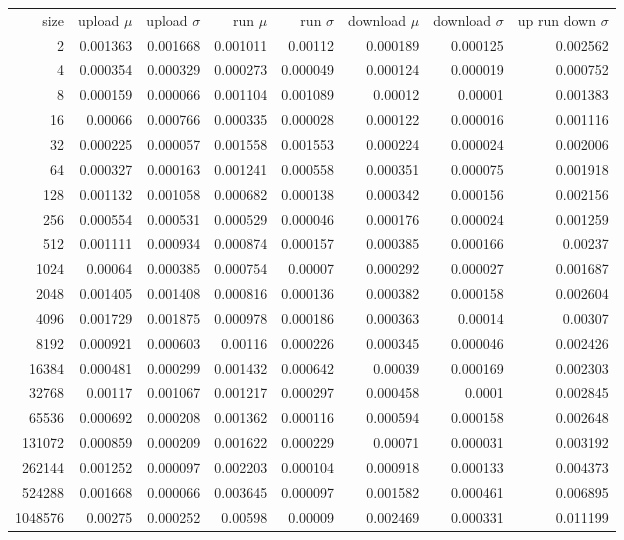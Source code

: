 \begin{tabular}{r r r r r r r r}
size & upload $\mu$  & upload $\sigma$ & run $\mu$ & run $\sigma$ & download $\mu$ & download $\sigma$ & up run down $\sigma$ \\
2 & 0.001363 & 0.001668 & 0.001011 & 0.00112 & 0.000189 & 0.000125 & 0.002562 \\
4 & 0.000354 & 0.000329 & 0.000273 & 0.000049 & 0.000124 & 0.000019 & 0.000752 \\
8 & 0.000159 & 0.000066 & 0.001104 & 0.001089 & 0.00012 & 0.00001 & 0.001383 \\
16 & 0.00066 & 0.000766 & 0.000335 & 0.000028 & 0.000122 & 0.000016 & 0.001116 \\
32 & 0.000225 & 0.000057 & 0.001558 & 0.001553 & 0.000224 & 0.000024 & 0.002006 \\
64 & 0.000327 & 0.000163 & 0.001241 & 0.000558 & 0.000351 & 0.000075 & 0.001918 \\
128 & 0.001132 & 0.001058 & 0.000682 & 0.000138 & 0.000342 & 0.000156 & 0.002156 \\
256 & 0.000554 & 0.000531 & 0.000529 & 0.000046 & 0.000176 & 0.000024 & 0.001259 \\
512 & 0.001111 & 0.000934 & 0.000874 & 0.000157 & 0.000385 & 0.000166 & 0.00237 \\
1024 & 0.00064 & 0.000385 & 0.000754 & 0.00007 & 0.000292 & 0.000027 & 0.001687 \\
2048 & 0.001405 & 0.001408 & 0.000816 & 0.000136 & 0.000382 & 0.000158 & 0.002604 \\
4096 & 0.001729 & 0.001875 & 0.000978 & 0.000186 & 0.000363 & 0.00014 & 0.00307 \\
8192 & 0.000921 & 0.000603 & 0.00116 & 0.000226 & 0.000345 & 0.000046 & 0.002426 \\
16384 & 0.000481 & 0.000299 & 0.001432 & 0.000642 & 0.00039 & 0.000169 & 0.002303 \\
32768 & 0.00117 & 0.001067 & 0.001217 & 0.000297 & 0.000458 & 0.0001 & 0.002845 \\
65536 & 0.000692 & 0.000208 & 0.001362 & 0.000116 & 0.000594 & 0.000158 & 0.002648 \\
131072 & 0.000859 & 0.000209 & 0.001622 & 0.000229 & 0.00071 & 0.000031 & 0.003192 \\
262144 & 0.001252 & 0.000097 & 0.002203 & 0.000104 & 0.000918 & 0.000133 & 0.004373 \\
524288 & 0.001668 & 0.000066 & 0.003645 & 0.000097 & 0.001582 & 0.000461 & 0.006895 \\
1048576 & 0.00275 & 0.000252 & 0.00598 & 0.00009 & 0.002469 & 0.000331 & 0.011199 \\

\end{tabular}
